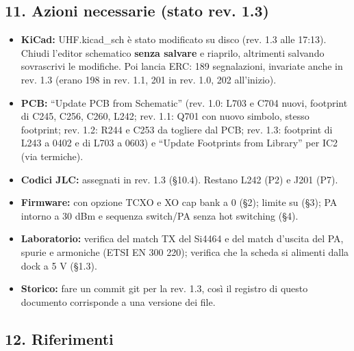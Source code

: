 \subsection[11. Azioni necessarie (stato rev. 1.3)]{11. Azioni necessarie (stato rev. 1.3)}

\begin{itemize}
\item \textbf{KiCad:} UHF.kicad\_\allowbreak{}sch è stato modificato su disco (rev. 1.3 alle 17:13). Chiudi l'editor schematico \textbf{senza salvare} e riaprilo, altrimenti salvando sovrascrivi le modifiche. Poi lancia ERC: 189 segnalazioni, invariate anche in rev. 1.3 (erano 198 in rev. 1.1, 201 in rev. 1.0, 202 all'inizio).
\item \textbf{PCB:} \textquotedblleft{}Update PCB from Schematic\textquotedblright{} (rev. 1.0: L703 e C704 nuovi, footprint di C245, C256, C260, L242; rev. 1.1: Q701 con nuovo simbolo, stesso footprint; rev. 1.2: R244 e C253 da togliere dal PCB; rev. 1.3: footprint di L243 a 0402 e di L703 a 0603) e \textquotedblleft{}Update Footprints from Library\textquotedblright{} per IC2 (via termiche).
\item \textbf{Codici JLC:} assegnati in rev. 1.3 (§10.4). Restano L242 (P2) e J201 (P7).
\item \textbf{Firmware:}  con opzione TCXO e XO cap bank a 0 (§2); limite su  (§3); PA intorno a 30 dBm e sequenza switch/\allowbreak{}PA senza hot switching (§4).
\item \textbf{Laboratorio:} verifica del match TX del Si4464 e del match d'uscita del PA, spurie e armoniche (ETSI EN 300 220); verifica che la scheda si alimenti dalla dock a 5 V (§1.3).
\item \textbf{Storico:} fare un commit git per la rev. 1.3, così il registro di questo documento corrisponde a una versione dei file.
\end{itemize}

\subsection[12. Riferimenti]{12. Riferimenti}

